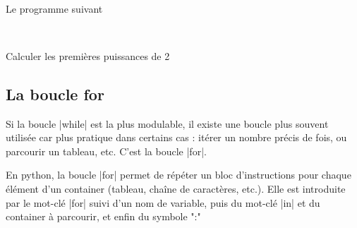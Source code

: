 \newpage

\begin{myexamples}
	\\
	\begin{multicols}{2}
		Le programme suivant  
		\begin{lstlisting}
			
		\end{lstlisting}
	\end{multicols}	
	\item Calculer les premières puissances de 2
\end{myexamples}




\subsection{La boucle \textsf{for}}

Si la boucle |while| est la plus modulable, il existe une boucle plus souvent utilisée car plus pratique dans certains cas : itérer un nombre précis de fois, ou parcourir un tableau, etc. C'est la boucle |for|.


\begin{mydefinition} En python, la boucle |for| permet de répéter un bloc d'instructions pour chaque élément d'un container (tableau, chaîne de caractères, etc.). Elle est introduite par le mot-clé |for| suivi d'un nom de variable, puis du mot-clé |in| et du container à parcourir, et enfin du symbole ":" 
\end{mydefinition}

